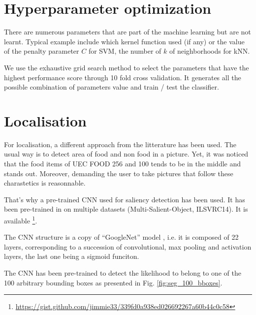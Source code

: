 \section{Hyperparameter optimization}

There are numerous parameters that are part of the machine learning but are not learnt. Typical example include which kernel function used (if any) or the value of the penalty parameter $C$ for SVM, the number of $k$ of neighborhoods for kNN.

We use the exhaustive grid search method to select the parameters that have the highest performance score through 10 fold cross validation. It generates all the possible combination of parameters value and train / test the classifier.

\section{Localisation}

For localisation, a different approach from the litterature has been used. The usual way is to detect area of food and non food in a picture. Yet, it was noticed that the food items of UEC FOOD 256 and 100 tends to be in the middle and stands out. Moreover, demanding the user to take pictures that follow these charastetics is reasonnable.

That's why a pre-trained CNN used for saliency detection has been used. It has been pre-trained in \cite{zhang2015SOD} on multiple datasets (Multi-Salient-Object, ILSVRC14). It is available \footnote{\url{https://gist.github.com/jimmie33/339fd0a938ed026692267a60b44c0c58}}.

The CNN structure is a copy of \enquote{GoogleNet} model \cite{Szegedy2015}, i.e. it is composed of 22 layers, corresponding to a succession of convolutional, max pooling and activation layers, the last one being a sigmoid funciton.

The CNN has been pre-trained to detect the likelihood to belong to one of the 100 arbitrary bounding boxes as presented in Fig. \ref{fig:seg_100_bboxes}.

